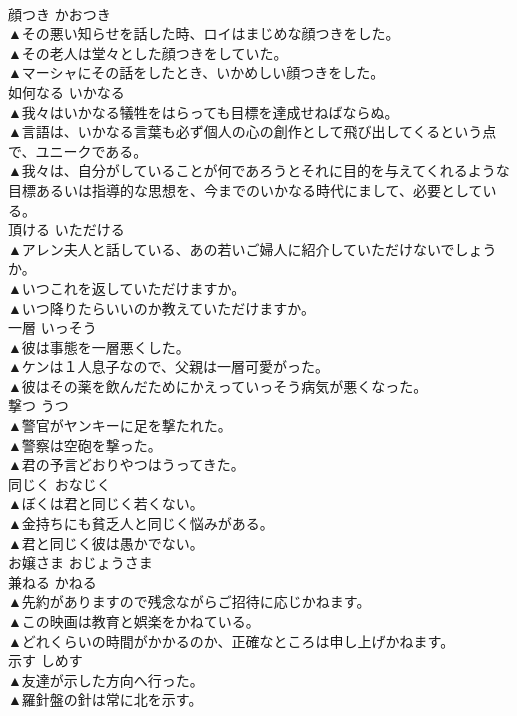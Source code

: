 \documentclass[8pt]{extreport}
\begin{document}
\begin{CJK}{UTF8}{min}
\\	顔つき	かおつき	
\\	▲その悪い知らせを話した時、ロイはまじめな顔つきをした。 
\\	▲その老人は堂々とした顔つきをしていた。 
\\	▲マーシャにその話をしたとき、いかめしい顔つきをした。 
\\	如何なる	いかなる	
\\	▲我々はいかなる犠牲をはらっても目標を達成せねばならぬ。 
\\	▲言語は、いかなる言葉も必ず個人の心の創作として飛び出してくるという点で、ユニークである。 
\\	▲我々は、自分がしていることが何であろうとそれに目的を与えてくれるような目標あるいは指導的な思想を、今までのいかなる時代にまして、必要としている。 
\\	頂ける	いただける	
\\	▲アレン夫人と話している、あの若いご婦人に紹介していただけないでしょうか。 
\\	▲いつこれを返していただけますか。 
\\	▲いつ降りたらいいのか教えていただけますか。 
\\	一層	いっそう	
\\	▲彼は事態を一層悪くした。 
\\	▲ケンは１人息子なので、父親は一層可愛がった。 
\\	▲彼はその薬を飲んだためにかえっていっそう病気が悪くなった。 
\\	撃つ	うつ	
\\	▲警官がヤンキーに足を撃たれた。 
\\	▲警察は空砲を撃った。 
\\	▲君の予言どおりやつはうってきた。 
\\	同じく	おなじく	
\\	▲ぼくは君と同じく若くない。 
\\	▲金持ちにも貧乏人と同じく悩みがある。 
\\	▲君と同じく彼は愚かでない。 
\\	お嬢さま	おじょうさま	
\\	兼ねる	かねる	
\\	▲先約がありますので残念ながらご招待に応じかねます。 
\\	▲この映画は教育と娯楽をかねている。 
\\	▲どれくらいの時間がかかるのか、正確なところは申し上げかねます。 
\\	示す	しめす	
\\	▲友達が示した方向へ行った。 
\\	▲羅針盤の針は常に北を示す。 

\end{CJK}
\end{document}
